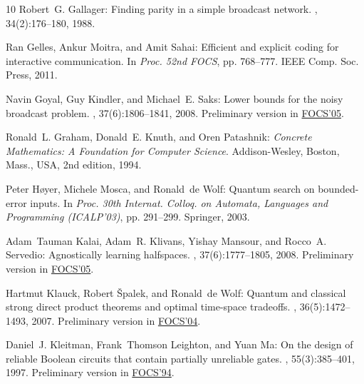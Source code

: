 \begin{thebibliography}{10}
{\sc Robert~G. Gallager}: Finding parity in a simple broadcast network.
, 34(2):176--180, 1988.
\newblock [\epfmtdoi{10.1109/18.2626}]

{\sc Ran Gelles, Ankur Moitra, and Amit Sahai}: Efficient and explicit coding
  for interactive communication.
\newblock In {\em Proc. 52nd FOCS}, pp. 768--777. IEEE Comp. Soc. Press, 2011.

{\sc Navin Goyal, Guy Kindler, and Michael~E. Saks}: Lower bounds for the noisy
  broadcast problem.
, 37(6):1806--1841, 2008.
\newblock Preliminary version in
  \href{http://dx.doi.org/10.1109/SFCS.2005.48}{FOCS'05}.
\newblock [\epfmtdoi{10.1137/060654864}]

{\sc Ronald~L. Graham, Donald~E. Knuth, and Oren Patashnik}: {\em Concrete
  Mathematics: A Foundation for Computer Science}.
\newblock Addison-Wesley, Boston, Mass., USA, 2nd edition, 1994.

{\sc Peter H{\o}yer, Michele Mosca, and Ronald~de Wolf}: Quantum search on
  bounded-error inputs.
\newblock In {\em Proc. 30th Internat. Colloq. on Automata, Languages and
  Programming (ICALP'03)}, pp. 291--299. Springer, 2003.
\newblock [\epfmtdoi{10.1007/3-540-45061-0\_25}]

{\sc Adam~Tauman Kalai, Adam~R. Klivans, Yishay Mansour, and Rocco~A.
  Servedio}: Agnostically learning halfspaces.
, 37(6):1777--1805, 2008.
\newblock Preliminary version in
  \href{http://dx.doi.org/10.1109/SFCS.2005.13}{FOCS'05}.
\newblock [\epfmtdoi{10.1137/060649057}]

{\sc Hartmut Klauck, Robert {\v S}palek, and Ronald~de Wolf}: Quantum and
  classical strong direct product theorems and optimal time-space tradeoffs.
, 36(5):1472--1493, 2007.
\newblock Preliminary version in
  \href{http://dx.doi.org/10.1109/FOCS.2004.52}{FOCS'04}.
\newblock [\epfmtdoi{10.1137/05063235X}]

{\sc Daniel~J. Kleitman, Frank~Thomson Leighton, and Yuan Ma}: On the design of
  reliable {B}oolean circuits that contain partially unreliable gates.
, 55(3):385--401, 1997.
\newblock Preliminary version in
  \href{http://dx.doi.org/10.1109/SFCS.1994.365682}{FOCS'94}.


\end{thebibliography}
